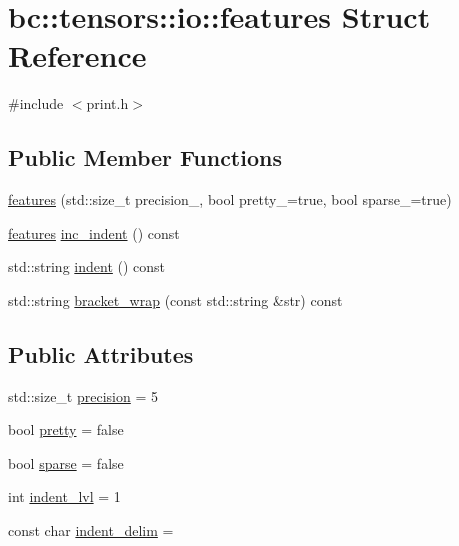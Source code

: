 \hypertarget{structbc_1_1tensors_1_1io_1_1features}{}\section{bc\+:\+:tensors\+:\+:io\+:\+:features Struct Reference}
\label{structbc_1_1tensors_1_1io_1_1features}


{\ttfamily \#include $<$print.\+h$>$}

\subsection*{Public Member Functions}
\begin{DoxyCompactItemize}
\item 
\hyperlink{structbc_1_1tensors_1_1io_1_1features_ad5adb7defbf361fc9f2270469f119c88}{features} (std\+::size\+\_\+t precision\+\_\+, bool pretty\+\_\+=true, bool sparse\+\_\+=true)
\item 
\hyperlink{structbc_1_1tensors_1_1io_1_1features}{features} \hyperlink{structbc_1_1tensors_1_1io_1_1features_ad72783b0f74a117b9417f2c667313b75}{inc\+\_\+indent} () const
\item 
std\+::string \hyperlink{structbc_1_1tensors_1_1io_1_1features_ac44e9b475fbc9d1ce5b02ecea49bcf5e}{indent} () const
\item 
std\+::string \hyperlink{structbc_1_1tensors_1_1io_1_1features_a95d5d59f0e760068f8bb0845677659f8}{bracket\+\_\+wrap} (const std\+::string \&str) const
\end{DoxyCompactItemize}
\subsection*{Public Attributes}
\begin{DoxyCompactItemize}
\item 
std\+::size\+\_\+t \hyperlink{structbc_1_1tensors_1_1io_1_1features_a9de0ca4106f7f1741ee14f8049e325fd}{precision} = 5
\item 
bool \hyperlink{structbc_1_1tensors_1_1io_1_1features_a09ae621f44c62e74b9f1601ea6b87ab6}{pretty} = false
\item 
bool \hyperlink{structbc_1_1tensors_1_1io_1_1features_a4527bedd42d68b3e3668e0de5c05bfa8}{sparse} = false
\item 
int \hyperlink{structbc_1_1tensors_1_1io_1_1features_a85866a46a3ed21a959a455160744756d}{indent\+\_\+lvl} = 1
\item 
const char \hyperlink{structbc_1_1tensors_1_1io_1_1features_a068197a93c51030df9b2f0027aa46a0f}{indent\+\_\+delim} = \textquotesingle{} \textquotesingle{}
\end{DoxyCompactItemize}


